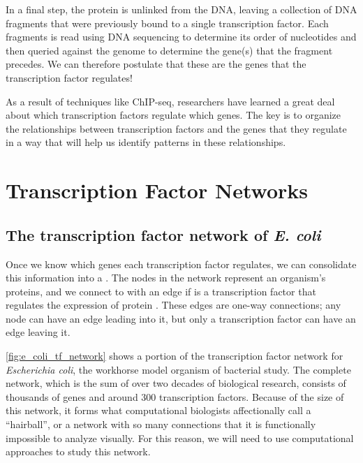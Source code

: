 In a final step, the protein is unlinked from the DNA, leaving a collection of DNA fragments that were previously bound to a single transcription factor. Each fragments is read using DNA sequencing to determine its order of nucleotides and then queried against the genome to determine the gene(s) that the fragment precedes. We can therefore postulate that these are the genes that the transcription factor regulates!\\

\begin{qbox}\end{qbox}

As a result of techniques like ChIP-seq, researchers have learned a great deal about which transcription factors regulate which genes. The key is to organize the relationships between transcription factors and the genes that they regulate in a way that will help us identify patterns in these relationships.\\


\FloatBarrier
{}

\section{Transcription Factor Networks}
\label{sec:transcription_factor_networks}

\subsection{The transcription factor network of \textit{E. coli}}

Once we know which genes each transcription factor regulates, we can consolidate this information into a . The nodes in the network represent an organism's proteins, and we connect  to  with an edge if  is a transcription factor that regulates the expression of protein . These edges are one-way connections; any node can have an edge leading into it, but only a transcription factor can have an edge leaving it.

\autoref{fig:e_coli_tf_network} shows a portion of the transcription factor network for \textit{Escherichia coli}, the workhorse model organism of bacterial study. The complete network, which is the sum of over two decades of biological research, consists of thousands of genes and around 300 transcription factors. Because of the size of this network, it forms what computational biologists affectionally call a ``hairball'', or a network with so many connections that it is functionally impossible to analyze visually. For this reason, we will need to use computational approaches to study this network.

